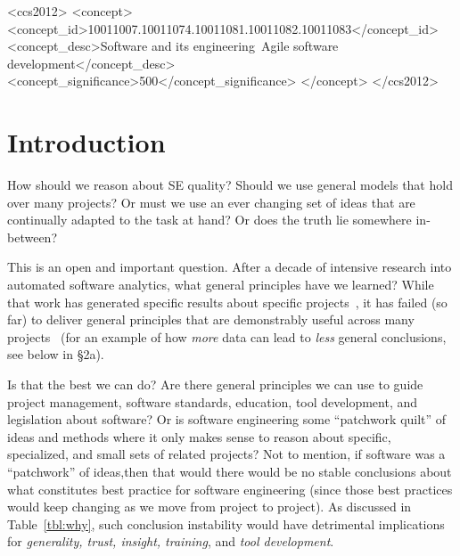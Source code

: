 \documentclass[sigconf,review]{acmart}
\theoremstyle{break}
\begin{document}
\begin{CCSXML}
<ccs2012>
<concept>
<concept_id>10011007.10011074.10011081.10011082.10011083</concept_id>
<concept_desc>Software and its engineering~Agile software 
development</concept_desc>
<concept_significance>500</concept_significance>
</concept>
</ccs2012>
\end{CCSXML}





\maketitle

\pagestyle{plain}

\section{Introduction}
How should we reason about SE quality?  Should we use  general models that hold over many projects? Or must we use an ever changing set of ideas that are   continually adapted to the task at hand? 
Or does the truth lie somewhere in-between?  

This is an open and important question. After a decade of intensive research into automated software analytics, what general principles have we learned? While that work has generated specific results about specific projects~\cite{Bird:2015,menzies2013software}, it has failed (so far) to deliver general principles that are demonstrably useful across many projects~\cite{menzies2013guest} (for an example of how {\em more} data can lead to {\em less} general conclusions, see below in {\S}2a).

Is that the best we can do? Are there general principles we can use to guide project management, software standards, education,   tool development, and legislation about software? 
Or is  software engineering some ``patchwork quilt'' of ideas and methods where it only makes sense to reason about specific, specialized, and small sets of related projects? Not to mention, if software was a ``patchwork'' of ideas,then that would  there would be no stable conclusions about what constitutes best practice for software engineering (since those best practices would keep changing as we move from project to project). As discussed in Table~\ref{tbl:why}, such conclusion instability would have detrimental implications for {\em generality, trust, insight, training}, and {\em tool development}.
\end{document}
